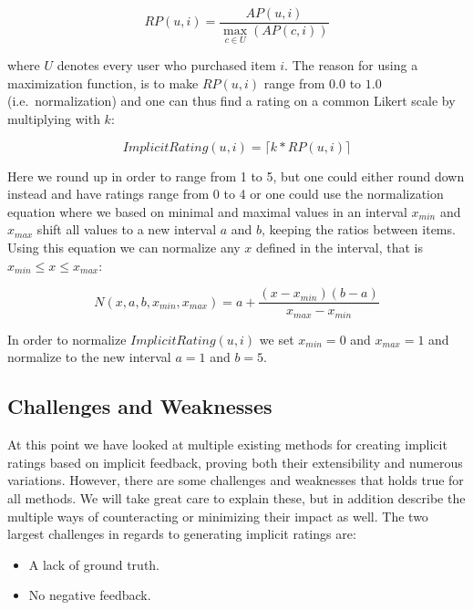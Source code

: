 \begin{equation}
  RP(u,i) = \frac{AP(u,i)}{\max_{c \in U}(AP(c,i))}
\end{equation}

where $U$ denotes every user who purchased item $i$. The reason for using a
maximization function, is to make $RP(u,i)$ range from $0.0$ to $1.0$ (i.e.\
normalization) and one can thus find a rating on a common Likert scale by
multiplying with $k$:

\begin{equation}
  ImplicitRating(u,i) = \lceil k * RP(u,i) \rceil
\end{equation}

Here we round up in order to range from 1 to 5, but one could either round down
instead and have ratings range from 0 to 4 or one could use the normalization
equation where we based on minimal and maximal values in an interval $x_{min}$
and $x_{max}$ shift all values to a new interval $a$ and $b$, keeping the
ratios between items. Using this equation we can normalize any $x$ defined in
the interval, that is $x_{min} \leq x \leq x_{max}$:

\begin{equation}
  \label{eq-normalization}
  N(x, a, b, x_{min}, x_{max}) = a + \frac{(x-x_{min})(b-a)}{x_{max}-x_{min}}
\end{equation}

In order to normalize $ImplicitRating(u,i)$ we set $x_{min} = 0$ and $x_{max} =
1$ and normalize to the new interval $a=1$ and $b=5$.

\subsection{Challenges and Weaknesses}
\label{implicit-weaknesses}

At this point we have looked at multiple existing methods for creating implicit
ratings based on implicit feedback, proving both their extensibility and
numerous variations. However, there are some challenges and weaknesses that
holds true for all methods. We will take great care to explain these, but in
addition describe the multiple ways of counteracting or minimizing their
impact as well. The two largest challenges in regards to generating implicit
ratings are:


\begin{itemize}
  \item A lack of ground truth.
  \item No negative feedback.
\end{itemize}

